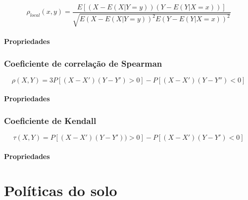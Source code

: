 \documentclass[
	12pt,				%
	oneside,			%
	a4paper,			%
	chapter=TITLE,		%
	section=TITLE,		%
	english,			%
	brazil				%
	]{abntex2}
\begin{document}
\[\rho_{local}(x, y) = \frac{E[(X - E(X|Y = y))(Y - E(Y|X = x))]}{\sqrt{E(X - E(X|Y = y))^2 E(Y - E(Y |X = x))^2}}\]

\hypertarget{propriedades-1}{%
\subsubsection{Propriedades}\label{propriedades-1}}

\hypertarget{coeficiente-de-correlauxe7uxe3o-de-spearman}{%
\subsection{Coeficiente de correlação de Spearman}\label{coeficiente-de-correlauxe7uxe3o-de-spearman}}

\[\rho(X, Y ) = 3P[(X - X')(Y - Y') > 0] - P[(X - X')(Y - Y'' ) < 0]\]

\hypertarget{propriedades-2}{%
\subsubsection{Propriedades}\label{propriedades-2}}

\hypertarget{coeficiente-de-kendall}{%
\subsection{Coeficiente de Kendall}\label{coeficiente-de-kendall}}

\[\tau(X, Y ) = P[(X - X')(Y - Y')) > 0] - P[(X - X')(Y - Y') < 0]\]

\hypertarget{propriedades-3}{%
\subsubsection{Propriedades}\label{propriedades-3}}

\hypertarget{politicas}{%
\chapter{Políticas do solo}\label{politicas}}
\end{document}
